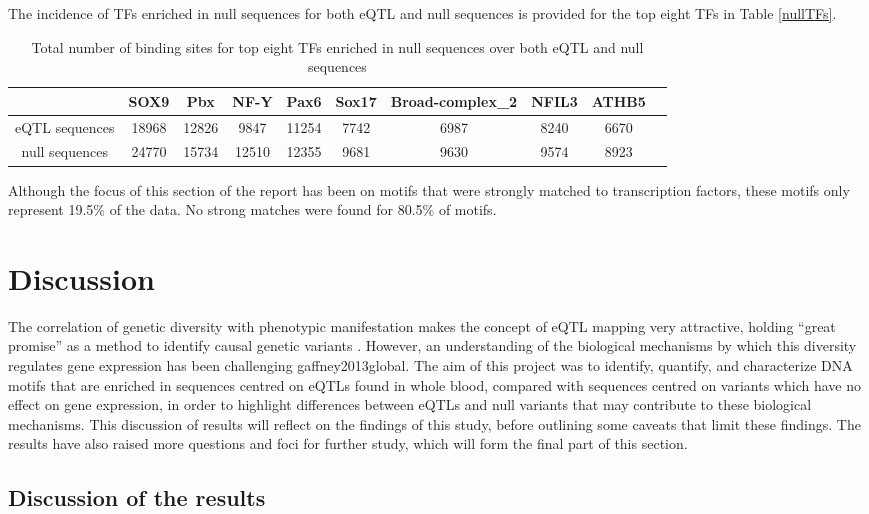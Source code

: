\documentclass[12pt]{article}
\begin{document}
The incidence of TFs enriched in null sequences for both eQTL and null sequences is provided for the top eight TFs in Table \ref{nullTFs}.

\begin{table}[!htbp]
\caption{Total number of binding sites for top eight TFs enriched in null sequences over both eQTL and null sequences}
\label{TFnos}
\centering
\begin{tabular}{cccccccccc}
\toprule[0.2em]
&SOX9&Pbx&NF-Y&Pax6&Sox17&Broad-complex{\_}2&NFIL3&ATHB5\\
\midrule[0.1em]
eQTL sequences&18968&12826&9847&11254&7742&6987&8240&6670\\
null sequences&24770&15734&12510&12355&9681&9630&9574&8923\\
 \bottomrule[0.2em]
\end{tabular}
\end{table}


Although the focus of this section of the report has been on motifs that were strongly matched to transcription factors, these motifs only represent 19.5\% of the data. No strong matches were found for 80.5\% of motifs. 



\section{Discussion}


The correlation of genetic diversity with phenotypic manifestation makes the concept of eQTL mapping very attractive⁠, holding “great promise” as a method to identify causal genetic variants \citep{Pai2015}⁠. However, an understanding of the biological mechanisms by which this diversity regulates gene expression has been challenging \citep{Pai2015}{gaffney2013global}⁠. The aim of this project was to identify, quantify, and characterize DNA motifs that are enriched in sequences centred on eQTLs found in whole blood, compared with sequences centred on variants which have no effect on gene expression, in order to highlight differences between eQTLs and null variants that may contribute to these biological mechanisms. This discussion of results will reflect on the findings of this study, before outlining some caveats that limit these findings. The results have also raised more questions and foci for further study, which will form the final part of this section.

\subsection{Discussion of the results}
\end{document}
